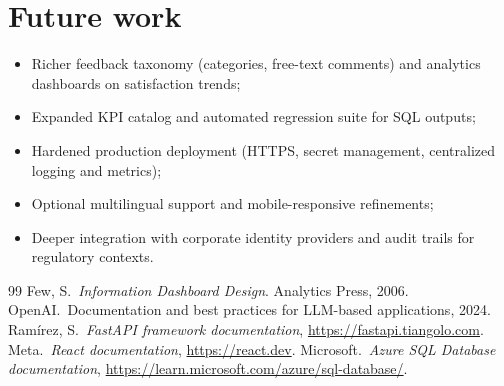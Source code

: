 \documentclass[12pt,a4paper,openany]{report}
\begin{document}
\section{Future work}
\begin{itemize}[leftmargin=*]
  \item Richer feedback taxonomy (categories, free-text comments) and analytics dashboards on satisfaction trends;
  \item Expanded KPI catalog and automated regression suite for SQL outputs;
  \item Hardened production deployment (HTTPS, secret management, centralized logging and metrics);
  \item Optional multilingual support and mobile-responsive refinements;
  \item Deeper integration with corporate identity providers and audit trails for regulatory contexts.
\end{itemize}


\begin{thebibliography}{99}
 Few, S.\ \emph{Information Dashboard Design}. Analytics Press, 2006.
 OpenAI.\ Documentation and best practices for LLM-based applications, 2024.
 Ramírez, S.\ \emph{FastAPI framework documentation}, \url{https://fastapi.tiangolo.com}.
 Meta.\ \emph{React documentation}, \url{https://react.dev}.
 Microsoft.\ \emph{Azure SQL Database documentation}, \url{https://learn.microsoft.com/azure/sql-database/}.
\end{thebibliography}
\end{document}

